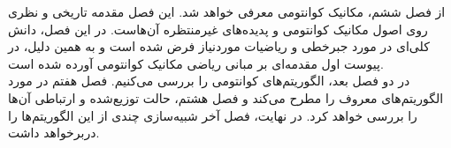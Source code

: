 از فصل ششم، مکانیک کوانتومی معرفی خواهد شد. این فصل مقدمه تاریخی و نظری روی اصول مکانیک کوانتومی و پدیده‌های غیرمنتظره آن‌هاست. در این فصل، دانش کلی‌ای در مورد جبرخطی و ریاضیات موردنیاز فرض شده است و به همین دلیل، در پیوست اول مقدمه‌ای بر مبانی ریاضی مکانیک کوانتومی آورده شده است.\\

در دو فصل بعد، الگوریتم‌های کوانتومی را بررسی می‌کنیم. فصل هفتم در مورد الگوریتم‌های معروف را مطرح می‌کند و فصل هشتم، حالت توزیع‌شده و ارتباطی آن‌ها را بررسی خواهد کرد.
در نهایت، فصل آخر شبیه‌سازی چندی از این الگوریتم‌ها را دربرخواهد داشت.